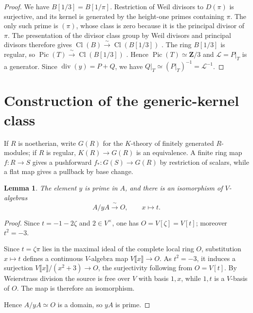 \documentclass[10pt]{amsart}
\DeclareMathOperator{\Pic}{Pic}
\DeclareMathOperator{\Cl}{Cl}
\newtheorem{lemma}[lemma]{Lemma}
\theoremstyle{remark}
\begin{document}
\begin{proof}
	
	
	
	
	
	
	We have $B[1/3]=B[1/\pi]$.  Restriction of Weil divisors to
	$D(\pi)$ is surjective, and its kernel is generated by the height-one
	primes containing $\pi$.  The only such prime is $(\pi)$, whose class is
	zero because it is the principal divisor of $\pi$.  The presentation of
	the divisor class group by Weil divisors and principal divisors therefore
	gives
	\(
	\Cl(B)\xrightarrow{\ \sim\ }\Cl(B[1/3])
	\)
	\cite[Tags~0BE2, 0BE3 and~0BE4]{StacksProject}.  The ring $B[1/3]$ is regular, so
	\(
	\Pic(T)\xrightarrow{\ \sim\ }\Cl(B[1/3])
	\)
	\cite[Tags~0AG0 and~0BE9]{StacksProject}.  Hence $\Pic(T)\simeq\mathbf Z/3$ and
	$\mathcal L=P|_T$ is a generator.  Since $\operatorname{div}(y)=P+Q$, we have
	$Q|_T\simeq(P|_T)^{-1}=\mathcal L^{-1}$.
\end{proof}



\section{Construction of the generic-kernel class}



If $R$ is noetherian, write $G(R)$ for the $K$-theory of finitely generated
$R$-modules; if $R$ is regular, $K(R)\to G(R)$ is an equivalence.  
A finite ring map \(f\colon R\to S\) gives a pushforward
\(
f_*\colon G(S)\longrightarrow G(R)
\)
by restriction of scalars, while a flat map gives a pullback by
base change.


\begin{lemma}\label{lem:divisor-y}
	The element $y$ is prime in $A$, and there is an isomorphism of
	$V$-algebras
	\[
	A/yA\xrightarrow{\ \sim\ }O,\qquad x\longmapsto t.
	\]
\end{lemma}

\begin{proof}
	Since \(t=-1-2\zeta\) and \(2\in V^\times\), one has
	\(O=V[\zeta]=V[t]\); moreover \(t^2=-3\).  
	
	Since \(t=\zeta\pi\) lies in the maximal ideal of the complete local
	ring \(O\), substitution \(x\mapsto t\) defines a continuous
	\(V\)-algebra map \(V\llbracket x\rrbracket\to O\).  As \(t^2=-3\),
	it induces a surjection
	\(
	V\llbracket x\rrbracket/(x^2+3)\to O
	\),
	the surjectivity following from \(O=V[t]\).
	By Weierstrass division the source is free over \(V\) with basis
	\(1,x\), while \(1,t\) is a \(V\)-basis of \(O\).  The map is therefore
	an isomorphism.
	
	
	
	
	Hence \(A/yA\simeq O\) is a domain, so \(yA\) is
	prime.
\end{proof}
\end{document}
